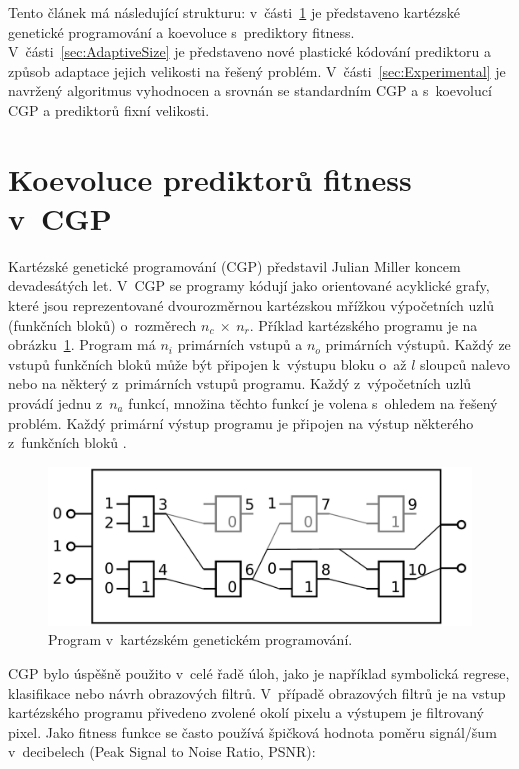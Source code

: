 \documentclass[fleqn,11pt]{ExcelAtFIT} %
\begin{document}
Tento článek má následující strukturu: v~části~\ref{sec:Coevolution} je představeno kartézské genetické programování a koevoluce s~prediktory fitness. V~části~\ref{sec:AdaptiveSize} je představeno nové plastické kódování prediktoru a způsob adaptace jejich velikosti na řešený problém. V~části~\ref{sec:Experimental} je navržený algoritmus vyhodnocen a srovnán se standardním CGP a s~koevolucí CGP a prediktorů fixní velikosti.



\section{Koevoluce prediktorů fitness v~CGP}
\label{sec:Coevolution}

Kartézské genetické programování (CGP) představil Julian Miller koncem devadesátých let. V~CGP se programy kódují jako orientované acyklické grafy, které jsou reprezentované dvourozměrnou kartézskou mřížkou výpočetních uzlů (funkčních bloků) o~roz\-mě\-rech $n_c~\times~n_r$. Příklad kartézského programu je na obrázku~\ref{fig:CgpCircuit}. Program má $n_i$ primárních vstupů a $n_o$ primárních výstupů. Každý ze vstupů funkčních bloků může být připojen k~výstupu bloku o~až $l$ sloupců nalevo nebo na některý z~primárních vstupů programu. Každý z~výpočetních uzlů provádí jednu z~$n_a$ funkcí, množina těchto funkcí je volena s~ohledem na řešený problém. Každý primární výstup programu je připojen na výstup některého z~funkčních bloků \cite{ZelenaCGP}.

\begin{figure}[h]
    \centering\includegraphics[width=0.75\linewidth]{images/cgp.pdf}
    \caption{Program v~kartézském genetickém programování.}
    \label{fig:CgpCircuit}
\end{figure}

CGP bylo úspěšně použito v~celé řadě úloh, jako je například symbolická regrese, klasifikace nebo návrh obrazových filtrů. V~případě obrazových filtrů je na vstup kartézského programu přivedeno zvolené okolí pixelu a výstupem je filtrovaný pixel. Jako fitness funkce se často používá špičková hodnota poměru signál/šum v~decibelech (Peak Signal to Noise Ratio, PSNR):
\end{document}
